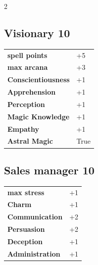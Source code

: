 \begin{multicols}{2}
\begin{tcolorbox}

\end{tcolorbox}

\begin{tcolorbox}
    \subsection*{Visionary \hfill \small{10 }}
    \tcblower




\begin{tabular}{@{}ll@{}}
    \textbf{spell points} & +5\\
    \textbf{max arcana} & +3\\
    \textbf{Conscientiousness} & +1\\
    \textbf{Apprehension} & +1\\
    \textbf{Perception} & +1\\
    \textbf{Magic Knowledge} & +1\\
    \textbf{Empathy} & +1\\
    \textbf{Astral Magic} & True\\
\end{tabular}


\end{tcolorbox}

\begin{tcolorbox}
    \subsection*{Sales manager \hfill \small{10 }}
    \tcblower




\begin{tabular}{@{}ll@{}}
    \textbf{max stress} & +1\\
    \textbf{Charm} & +1\\
    \textbf{Communication} & +2\\
    \textbf{Persuasion} & +2\\
    \textbf{Deception} & +1\\
    \textbf{Administration} & +1\\
\end{tabular}


\end{tcolorbox}
\end{multicols}
